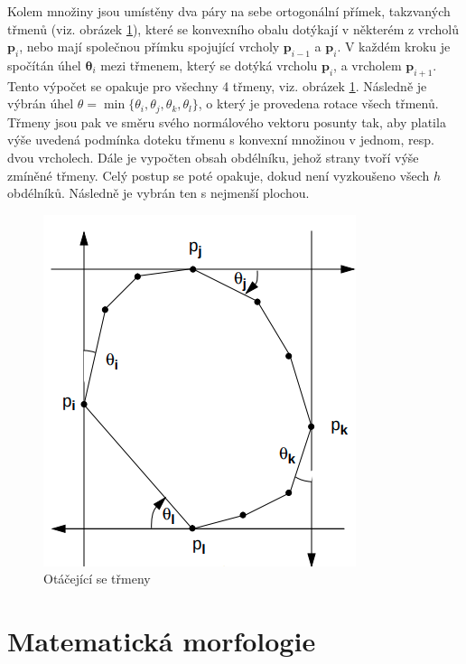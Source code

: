 \documentclass[twoside]{ctuthesis}
\newcommand{\tli}[2]{$\mathbf{#1}_{#2}$}
\begin{document}
Kolem množiny jsou umístěny dva páry na sebe ortogonální přímek, takzvaných třmenů (viz. obrázek \ref{fig:rotating_calipers}), které se konvexního obalu dotýkají v některém z vrcholů $\mathbf{p}_i$, nebo mají společnou přímku spojující vrcholy \tli{p}{i-1} a \tli{p}{i}. V každém kroku je spočítán úhel \tli{\theta}{i} mezi třmenem, který se dotýká vrcholu \tli{p}{i}, a vrcholem \tli{p}{i+1}. Tento výpočet se opakuje pro všechny 4 třmeny, viz. obrázek \ref{fig:rotating_calipers}. Následně je výbrán úhel $\theta = \min \{ \theta_i, \theta_j, \theta_k, \theta_l \}$, o který je provedena rotace všech třmenů. Třmeny jsou pak ve směru svého normálového vektoru posunty tak, aby platila výše uvedená podmínka doteku třmenu s konvexní množinou v jednom, resp. dvou vrcholech. Dále je vypočten obsah obdélníku, jehož strany tvoří výše zmíněné třmeny. Celý postup se poté opakuje, dokud není vyzkoušeno všech $h$ obdélníků. Následně je vybrán ten s nejmenší plochou.

\begin{figure}
    \centering
    \includegraphics[width = 0.7 \linewidth]{pictures/rotating_calipers.png}
    \caption{Otáčející se třmeny}
    \label{fig:rotating_calipers}
\end{figure}

\section{Matematická morfologie}
\label{sec:morphology}
\end{document}
